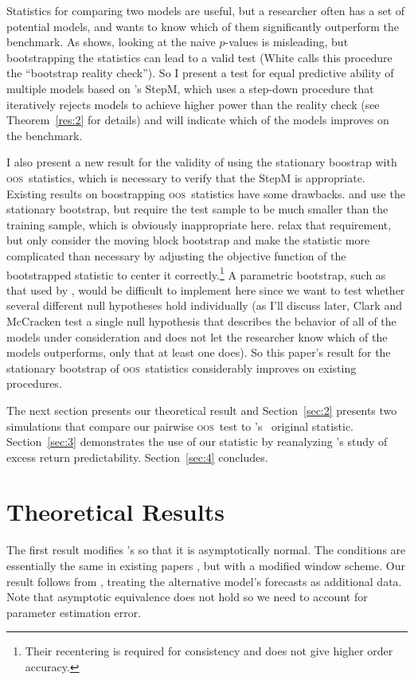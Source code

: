 \documentclass[12pt]{article}
\newcommand\citepos[2][]{\citeauthor{#2}'s \citeyearpar[#1]{#2}}
\newcommand\poscw{\citeauthor{ClW:06}'s \citeyearpar{ClW:06,ClW:07}}
\theoremstyle{definition}
\newcommand{\oos}{\textsc{oos}}
\begin{document}
Statistics for comparing two models are useful, but a researcher often
has a set of potential models, and wants to know which of them
significantly outperform the benchmark.  As \citet{Whi:00} shows,
looking at the naive $p$-values is misleading, but bootstrapping the
statistics can lead to a valid test (White calls this procedure the
``bootstrap reality check'').  So I present a test for equal
predictive ability of multiple models based on \citepos{RoW:05} StepM,
which uses a step-down procedure that iteratively rejects models to
achieve higher power than the reality check (see Theorem~\ref{res:2}
for details) and will indicate which of the models improves on the
benchmark.

I also present a new result for the validity of using the stationary
boostrap with \oos\ statistics, which is necessary to verify that the
StepM is appropriate.  Existing results on boostrapping
\oos\ statistics have some drawbacks.  \citet{Whi:00} and
\citet{Han:05} use the stationary bootstrap, but require the test
sample to be much smaller than the training sample, which is obviously
inappropriate here.  \citet{CoS:07} relax that requirement, but only
consider the moving block bootstrap \citep{LiS:92,Kun:89} and make the
statistic more complicated than necessary by adjusting the objective
function of the bootstrapped statistic to center it
correctly.\footnote{Their recentering is required for consistency and
  does not give higher order accuracy.}  A parametric bootstrap, such
as that used by \citet{ClM:11}, would be difficult to implement here
since we want to test whether several different null hypotheses hold
individually (as I'll discuss later, Clark and McCracken test a single
null hypothesis that describes the behavior of all of the models under
consideration and does not let the researcher know which of the models
outperforms, only that at least one does).  So this paper's result for
the stationary bootstrap of \oos\ statistics considerably improves on
existing procedures.

The next section presents our theoretical result and
Section~\ref{sec:2} presents two simulations that compare our pairwise
\oos\ test to \poscw\ original statistic.  Section~\ref{sec:3}
demonstrates the use of our statistic by reanalyzing \citepos{GoW:08}
study of excess return predictability. Section~\ref{sec:4} concludes.

\section{Theoretical Results}\label{sec:1}
The first result modifies \citepos{ClW:07} so that it is
asymptotically normal. The conditions are essentially the same in
existing papers
\citep[e.g.][]{ClW:07,ClW:06,Wes:96,WeM:98,Mcc:00,GiW:06}, but with a
modified window scheme.  Our result follows from \citet{Wes:96},
treating the alternative model's forecasts as additional data. Note
that asymptotic equivalence does not hold so we need to account for
parameter estimation error.
\end{document}

